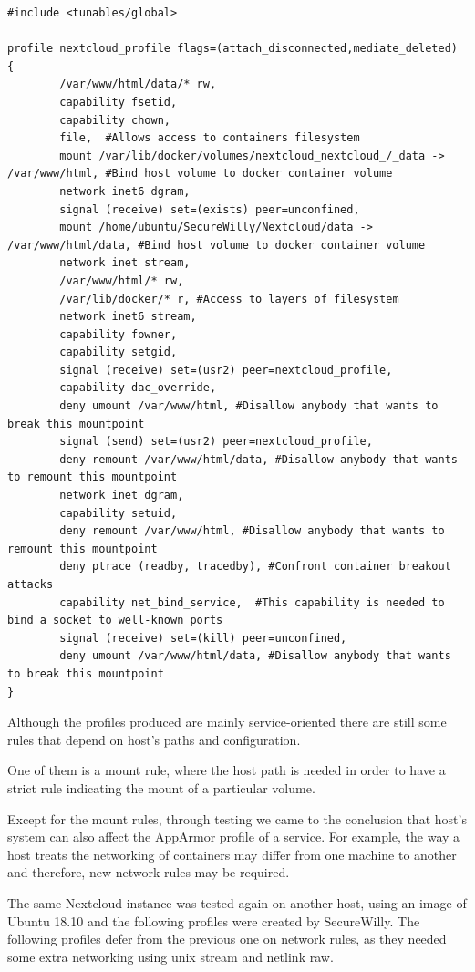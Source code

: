 \begin{lstlisting}[style=Dockerfile, caption={AppArmor profile for nextcloud service: nextcloud\_profile}]
#include <tunables/global>

profile nextcloud_profile flags=(attach_disconnected,mediate_deleted) {
        /var/www/html/data/* rw,
        capability fsetid,
        capability chown,
        file,  #Allows access to containers filesystem
        mount /var/lib/docker/volumes/nextcloud_nextcloud_/_data -> /var/www/html, #Bind host volume to docker container volume
        network inet6 dgram,
        signal (receive) set=(exists) peer=unconfined,
        mount /home/ubuntu/SecureWilly/Nextcloud/data -> /var/www/html/data, #Bind host volume to docker container volume
        network inet stream,
        /var/www/html/* rw,
        /var/lib/docker/* r, #Access to layers of filesystem
        network inet6 stream,
        capability fowner,
        capability setgid,
        signal (receive) set=(usr2) peer=nextcloud_profile,
        capability dac_override,
        deny umount /var/www/html, #Disallow anybody that wants to break this mountpoint
        signal (send) set=(usr2) peer=nextcloud_profile,
        deny remount /var/www/html/data, #Disallow anybody that wants to remount this mountpoint
        network inet dgram,
        capability setuid,
        deny remount /var/www/html, #Disallow anybody that wants to remount this mountpoint
        deny ptrace (readby, tracedby), #Confront container breakout attacks
        capability net_bind_service,  #This capability is needed to bind a socket to well-known ports
        signal (receive) set=(kill) peer=unconfined,
        deny umount /var/www/html/data, #Disallow anybody that wants to break this mountpoint
}
\end{lstlisting}

Although the profiles produced are mainly service-oriented there are still some rules that depend on host's paths and configuration.

One of them is a mount rule, where the host path is needed in order to have a strict rule indicating the mount of a particular volume.

Except for the mount rules, through testing we came to the conclusion that host's system can also affect the AppArmor profile of a service. For example, the way a host treats the networking of containers may differ from one machine to another and therefore, new network rules may be required.

The same Nextcloud instance was tested again on another host, using an image of Ubuntu 18.10 and the following profiles were created by SecureWilly. The following profiles defer from the previous one on network rules, as they needed some extra networking using unix stream and netlink raw.

